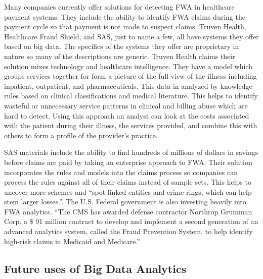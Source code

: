\documentclass[sigconf]{acmart}
\begin{document}
Many companies currently offer solutions for detecting FWA in healthcare payment systems. 
They include the ability to identify FWA claims during the payment cycle so that payment 
is not made to suspect claims.  Truven Health\cite{TruvenHealth}, Healthcare Fraud Shield\cite{FraudShield}, 
and SAS\cite{SASHealth}, just to name a few, all have systems they offer based on big data.  The 
specifics of the systems they offer are proprietary in nature so many of the descriptions are 
generic.  Truven Health claims their solution mixes technology and healthcare intelligence.  They 
have a model which groups services together for form a picture of the full view of the illness 
including inpatient, outpatient, and pharmaceuticals. This data in analyzed by knowledge rules based 
on clinical classifications and medical literature.  This helps to identify wasteful or unnecessary 
service patterns in clinical and billing abuse which are hard to detect.  Using this approach 
an analyst can look at the costs associated with the patient during their illness, the services 
provided, and combine this with others to form a profile of the provider's practice.\cite{TruvenHealth}

SAS materials include the ability to find hundreds of millions of dollars in savings before 
claims are paid by taking an enterprise approach to FWA.\cite{SASHealth}  Their solution 
incorporates the rules and models into the claims process so companies can process the rules 
against all of their claims instead of sample sets.  This helps to uncover more schemes and 
``spot linked entities and crime rings, which can help stem larger losses.''\cite{SASFraud}.  The 
U.S. Federal government is also investing heavily into FWA analytics.  ``The CMS has awarded 
defense contractor Northrop Grumman Corp. a \$ 91 million contract to develop and implement a 
second generation of an advanced analytics system, called the Fraud Prevention System, to 
help identify high-risk claims in Medicaid and Medicare.''\cite{ModernHealthcare}

\subsection{Future uses of Big Data Analytics}
\end{document}
